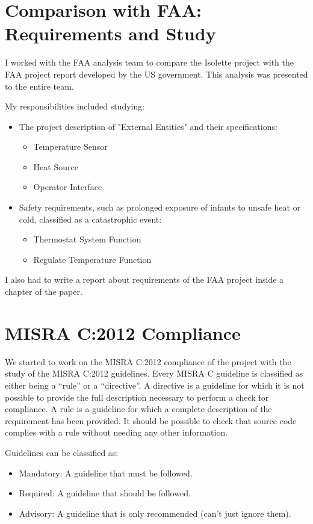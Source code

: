 \documentclass[a4paper, 12pt]{article}
\begin{document}
\section{Comparison with FAA: Requirements and Study}

I worked with the FAA analysis team to compare the Isolette project with the FAA project report developed by the US government. This analysis was presented to the entire team.

My responsibilities included studying:

\begin{itemize}
    \item The project description of "External Entities" and their specifications:
    \begin{itemize}
        \item Temperature Sensor
        \item Heat Source
        \item Operator Interface
    \end{itemize}
    \item Safety requirements, such as prolonged exposure of infants to unsafe heat or cold, classified as a catastrophic event:
    \begin{itemize}
        \item Thermostat System Function
        \item Regulate Temperature Function
    \end{itemize}
\end{itemize}

I also had to write a report about requirements of the FAA project inside a chapter of the paper.

\section{MISRA C:2012 Compliance}

We started to work on the MISRA C:2012 compliance of the project with the study of the MISRA C:2012 guidelines.
Every MISRA C guideline is classified as either being a “rule” or a “directive”.
A directive is a guideline for which it is not possible to provide the full description necessary to perform a check for compliance.
A rule is a guideline for which a complete description of the requirement has been provided. 
It should be possible to check that source code complies with a rule without needing any other information.

Guidelines can be classified as:
\begin{itemize}
    \item Mandatory: A guideline that must be followed.
    \item Required: A guideline that should be followed.
    \item Advisory: A guideline that is only recommended (can't just ignore them).
\end{itemize}
\end{document}
